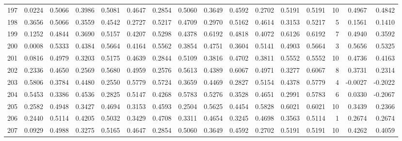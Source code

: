 \begin{tabular}{lrrrrrrrrrrrrrrr}
197 &      0.0224 &  0.5066 &  0.3986 &  0.5081 &  0.4647 &  0.2854 &  0.5060 &  0.3649 &  0.4592 &  0.2702 &   0.5191 &     0.5191 &     10 &                    0.4967 &                     0.4842 \\
198 &      0.3656 &  0.5066 &  0.3559 &  0.4542 &  0.2727 &  0.5217 &  0.4709 &  0.2970 &  0.5162 &  0.4614 &   0.3153 &     0.5217 &      5 &                    0.1561 &                     0.1410 \\
199 &      0.1252 &  0.4844 &  0.3690 &  0.5157 &  0.4207 &  0.5298 &  0.4378 &  0.6192 &  0.4818 &  0.4072 &   0.6126 &     0.6192 &      7 &                    0.4940 &                     0.3592 \\
200 &      0.0008 &  0.5333 &  0.4384 &  0.5664 &  0.4164 &  0.5562 &  0.3854 &  0.4751 &  0.3604 &  0.5141 &   0.4903 &     0.5664 &      3 &                    0.5656 &                     0.5325 \\
201 &      0.0816 &  0.4979 &  0.3203 &  0.5175 &  0.4639 &  0.2844 &  0.5109 &  0.3816 &  0.4702 &  0.3811 &   0.5552 &     0.5552 &     10 &                    0.4736 &                     0.4163 \\
202 &      0.2336 &  0.4650 &  0.2569 &  0.5680 &  0.4959 &  0.2576 &  0.5613 &  0.4389 &  0.6067 &  0.4971 &   0.3277 &     0.6067 &      8 &                    0.3731 &                     0.2314 \\
203 &      0.5806 &  0.3784 &  0.4480 &  0.2550 &  0.5779 &  0.5724 &  0.3659 &  0.4469 &  0.2827 &  0.5154 &   0.4378 &     0.5779 &      4 &                   -0.0027 &                    -0.2022 \\
204 &      0.5453 &  0.3386 &  0.4536 &  0.2825 &  0.5147 &  0.4268 &  0.5783 &  0.5276 &  0.3528 &  0.4651 &   0.2991 &     0.5783 &      6 &                    0.0330 &                    -0.2067 \\
205 &      0.2582 &  0.4948 &  0.3427 &  0.4694 &  0.3153 &  0.4593 &  0.2504 &  0.5625 &  0.4454 &  0.5828 &   0.6021 &     0.6021 &     10 &                    0.3439 &                     0.2366 \\
206 &      0.2440 &  0.5114 &  0.4205 &  0.5032 &  0.3429 &  0.4708 &  0.3311 &  0.4654 &  0.3245 &  0.4698 &   0.3563 &     0.5114 &      1 &                    0.2674 &                     0.2674 \\
207 &      0.0929 &  0.4988 &  0.3275 &  0.5165 &  0.4647 &  0.2854 &  0.5060 &  0.3649 &  0.4592 &  0.2702 &   0.5191 &     0.5191 &     10 &                    0.4262 &                     0.4059 \\

\end{tabular}
